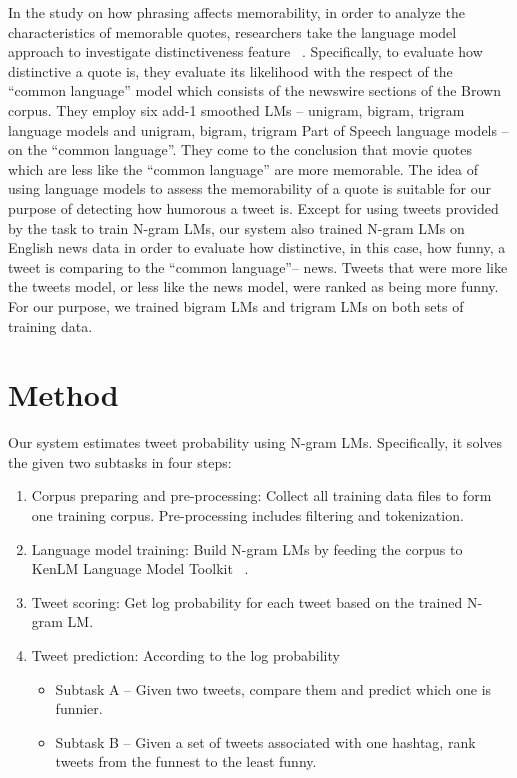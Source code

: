 \documentclass[11pt,a4paper]{article}
\begin{document}
\indent In the study on how phrasing affects memorability, in order to analyze the characteristics of memorable quotes, researchers take the language model approach to investigate distinctiveness feature ~\cite{hello}. Specifically, to evaluate how distinctive a quote is, they evaluate its likelihood with the respect of the ``common language'' model which consists of the newswire sections of the Brown corpus. They employ six add-1 smoothed LMs -- unigram, bigram, trigram language models and unigram, bigram, trigram Part of Speech language models -- on the ``common language''. They come to the conclusion that movie quotes which are less like the ``common language'' are more memorable. The idea of using language models to assess the memorability of a quote is suitable for our purpose of detecting how humorous a tweet is. Except for using tweets provided by the task to train N-gram LMs, our system also trained N-gram LMs on English news data in order to evaluate how distinctive, in this case, how funny, a tweet is comparing to the ``common language''-- news. Tweets that were more like the tweets model, or less like the news model, were ranked as being more funny. For our purpose, we trained bigram LMs and trigram LMs on both sets of training data.

\section{Method}
Our system estimates tweet probability using N-gram LMs. Specifically, it solves the given two subtasks in four steps:
\begin{enumerate}
\item Corpus preparing and pre-processing: Collect all training data files to form one training corpus. Pre-processing includes filtering and tokenization.
\item Language model training: Build N-gram LMs by feeding the corpus to KenLM Language Model Toolkit ~\cite{Heafield-estimate}. 
\item Tweet scoring: Get log probability for each tweet based on the trained N-gram LM.
\item Tweet prediction: According to the log probability
\begin{itemize}
\item Subtask A -- Given two tweets, compare them and predict which one is funnier. 
\item Subtask B -- Given a set of tweets associated with one hashtag, rank tweets from the funnest to the least funny.
\end{itemize}
\end{enumerate}
\end{document}
